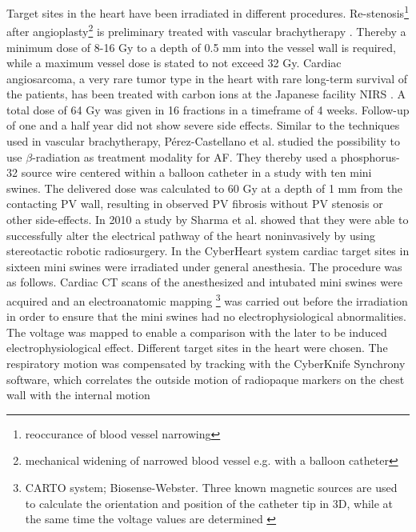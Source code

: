 \documentclass[type=dr, dr=rernat, accentcolor=tud7b,colorbacktitle, bigchapter, openright, twoside, 12pt ]{tudthesis}
\begin{document}
Target sites in the heart have been irradiated in different procedures. Re-stenosis\footnote{reoccurance of blood vessel narrowing} after 
angioplasty\footnote{mechanical widening of narrowed blood vessel e.g. with a balloon catheter} is preliminary treated with vascular 
brachytherapy \cite{Nat99} \cite{Cot05}. Thereby a minimum dose of 8-16 Gy to a depth of 0.5 mm into the vessel wall is required, while a 
maximum vessel dose is stated to not exceed 32 Gy. Cardiac angiosarcoma, a very rare tumor type in the heart with rare long-term 
survival of the patients, has been treated with carbon ions at the Japanese facility NIRS \cite{Aok04}. A total dose of 64 Gy was given in 16 
fractions in a timeframe of 4 weeks. Follow-up of one and a half year did not show severe side effects.\newline
\newline
Similar to the techniques used in vascular brachytherapy, P\'erez-Castellano et al. \cite{Per06} studied the possibility to use $\beta$-radiation 
as treatment modality for AF. They thereby used a phosphorus-32 source wire centered within a balloon catheter in a study with ten mini swines. 
The delivered dose was calculated to 60 Gy at a depth of 1 mm from the contacting PV wall, resulting in observed PV fibrosis without PV stenosis 
or other side-effects.\newline
\newline
In 2010 a study by Sharma et al. \cite{Sha10} showed that they were able to successfully alter the electrical pathway of the heart 
noninvasively by using stereotactic robotic radiosurgery. In the CyberHeart system cardiac target sites in sixteen mini swines were irradiated 
under general anesthesia. The procedure was as follows. Cardiac CT scans of the anesthesized and intubated mini swines were 
acquired and an electroanatomic mapping \footnote{CARTO system; Biosense-Webster. Three known magnetic sources are used to calculate the orientation 
and position of the catheter tip in 3D, while at the same time the voltage values are determined \cite{bw}} was carried out before the 
irradiation in order to ensure that the mini swines had no electrophysiological abnormalities. The voltage was mapped to enable a comparison 
with the later to be induced electrophysiological effect. Different target sites in the heart were chosen. The respiratory motion was 
compensated by tracking with the CyberKnife Synchrony software, which correlates the outside motion of radiopaque markers on the chest wall 
with the internal motion 
\end{document}

